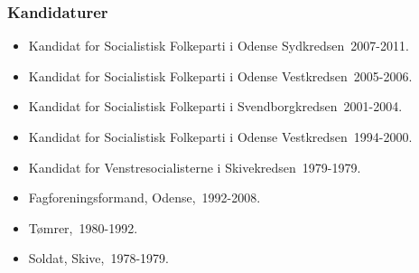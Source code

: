 \documentclass[11pt, a4paper]{awesome-cv}
\begin{document}
\begin{cvletter}
\subsubsection*{Kandidaturer}
\begin{itemize}
\item Kandidat for Socialistisk Folkeparti i Odense Sydkredsen 2007-2011.
\item Kandidat for Socialistisk Folkeparti i Odense Vestkredsen 2005-2006.
\item Kandidat for Socialistisk Folkeparti i Svendborgkredsen 2001-2004.
\item Kandidat for Socialistisk Folkeparti i Odense Vestkredsen 1994-2000.
\item Kandidat for Venstresocialisterne i Skivekredsen 1979-1979.
\end{itemize}
\begin{itemize}
\item Fagforeningsformand, Odense, 1992-2008.
\item Tømrer, 1980-1992.
\item Soldat, Skive, 1978-1979.
\end{itemize}
\end{cvletter}
\end{document}
